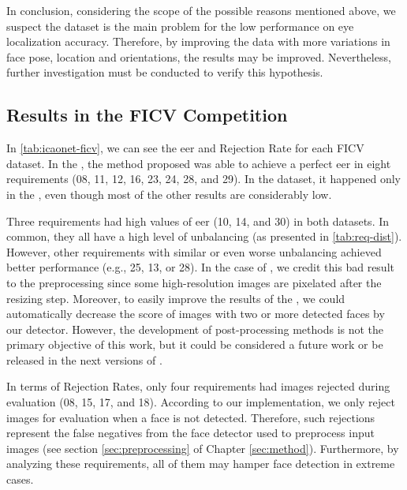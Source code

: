 In conclusion, considering the scope of the possible reasons mentioned above, we suspect the dataset is the main problem for the low performance on eye localization accuracy. Therefore, by improving the data with more variations in face pose, location and orientations, the results may be improved. Nevertheless, further investigation must be conducted to verify this hypothesis.


\subsection{Results in the FICV Competition} \label{sec:ficv_results}

In \autoref{tab:icaonet-ficv}, we can see the \acl{eer} and Rejection Rate for each FICV dataset. In the \ficvtest, the method proposed was able to achieve a perfect \acs{eer} in eight requirements (08, 11, 12, 16, 23, 24, 28, and 29). In the \ficvofficial dataset, it happened only in the \veiloverface, even though most of the other results are considerably low. 



Three requirements had high values of \acs{eer} (10, 14, and 30) in both datasets. In common, they all have a high level of unbalancing (as presented in \autoref{tab:req-dist}). However, other requirements with similar or even worse unbalancing achieved better performance (e.g., 25, 13, or 28). In the case of \pixelation, we credit this bad result to the preprocessing since some high-resolution images are pixelated after the resizing step. Moreover, to easily improve the results of the \otherfacesortoys, we could automatically decrease the score of images with two or more detected faces by our detector. However, the development of post-processing methods is not the primary objective of this work, but it could be considered a future work or be released in the next versions of \methodname.

In terms of Rejection Rates, only four requirements had images rejected during evaluation (08, 15, 17, and 18). According to our implementation, we only reject images for evaluation when a face is not detected. Therefore, such rejections represent the false negatives from the face detector used to preprocess input images (see section \ref{sec:preprocessing} of Chapter \ref{sec:method}). Furthermore, by analyzing these requirements, all of them may hamper face detection in extreme cases. 

